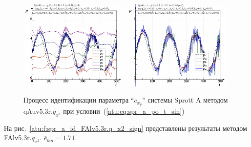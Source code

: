 \begin{figure}[h!]
  \centerline{
    \includegraphics[width=0.49\textwidth]{p/cha/spr_a/qAuv5.3r/sprott_a_qAuv5_3r_qx2-p_t_pi_sin.png}
    \hfill
    \includegraphics[width=0.49\textwidth]{p/cha/spr_a/qAuv5.3r/sprott_a_qAuv5_3r_qx2-p_t_pz_sin.png}
  }
  \caption{Процесс идентификации параметра ``$c_{x_y}$'' системы Sprott A методом qAuv5.3r.$q_{x^2}$ при условии~(\ref{atu:eq:spr_a_po_t_sin})}
  \label{atu:f:spr_a_id_qAuv5.3r.q_x2_sin}
\end{figure}


На рис.~\ref{atu:f:spr_a_id_FAlv5.3r.q_x2_sign} представлены результаты
методом FAlv5.3r.$q_{x^2}$.
$\overline{e}_{bm}=1.71$


